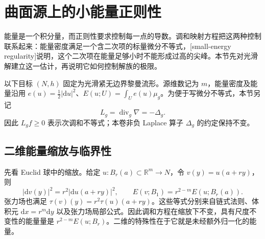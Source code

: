 
% 
% 
% 
% 
% 
% 

\section{曲面源上的小能量正则性}
\label{g3:sec:1803}

能量是一个积分量，而正则性要求控制每一点的导数。调和映射方程把这两种控制联系起来：能量密度满足一个含二次项的标量微分不等式，[small-energy regularity]说明，这个二次项在能量足够小时不能形成过高的尖峰。本节先对光滑解建立这一估计，再说明它如何控制解族的极限。

\ProseParagraphBreak

以下目标 \((N,h)\) 固定为光滑紧无边界黎曼流形。源维数记为 \(m\)，能量密度及能量沿用 \(e(u)=\tfrac12|\mathrm du|^2\)、\(E(u;U)=\int_U e(u)\mu_g\)。为便于写微分不等式，本节另记
\[
	L_g=\operatorname{div}_g\nabla=-\Delta_g.
\]
因此 \(L_g f\ge0\) 表示次调和不等式；本卷非负 Laplace 算子 \(\Delta_g\) 的约定保持不变。

\subsection{二维能量缩放与临界性}
\label{g3:subsec:1803:01}
先看 Euclid 球中的缩放。给定 \(u:B_r(a)\subset\mathbb R^m\to N\)，令 \(v(y)=u(a+ry)\)，则
\begin{equation}\label{g3:eq:harmonic-map-energy-scaling}
	|\mathrm dv(y)|^2=r^2|\mathrm du(a+ry)|^2,
	\qquad E(v;B_1)=r^{2-m}E(u;B_r(a)).
\end{equation}
张力场也满足 \(\tau(v)(y)=r^2\tau(u)(a+ry)\)。这些等式分别来自链式法则、体积元 \(\mathrm dx=r^m\mathrm dy\) 以及张力场局部公式。因此调和方程在缩放下不变，具有尺度不变性的能量量是 \(r^{2-m}E(u;B_r)\)。二维的特殊性在于它就是未经额外归一化的能量。

